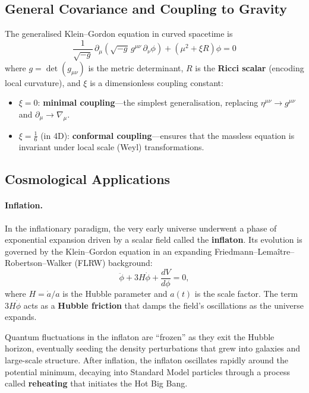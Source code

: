 \documentclass[12pt, a4paper]{article}
\theoremstyle{definition}
\begin{document}
\subsection{General Covariance and Coupling to Gravity}

The generalised Klein--Gordon equation in curved spacetime is
\begin{equation}\label{eq:KG-curved}
    \boxed{\;
    \frac{1}{\sqrt{-g}}\,\partial_{\mu}\!\left(
      \sqrt{-g}\,g^{\mu\nu}\,\partial_{\nu}\phi
    \right)
    + \left(\mu^{2} + \xi R\right)\phi = 0
    \;}
\end{equation}
where $g = \det(g_{\mu\nu})$ is the metric determinant, $R$ is the
\textbf{Ricci scalar} (encoding local curvature), and $\xi$ is a
dimensionless coupling constant:
\begin{itemize}
    \item $\xi = 0$: \textbf{minimal coupling}---the simplest
          generalisation, replacing $\eta^{\mu\nu}\to g^{\mu\nu}$ and
          $\partial_{\mu}\to\nabla_{\mu}$.
    \item $\xi = \tfrac{1}{6}$ (in 4D): \textbf{conformal coupling}---ensures
          that the massless equation is invariant under local scale
          (Weyl) transformations.
\end{itemize}

\subsection{Cosmological Applications}

\paragraph{Inflation.}
In the inflationary paradigm, the very early universe underwent a phase of
exponential expansion driven by a scalar field called the \textbf{inflaton}.
Its evolution is governed by the Klein--Gordon equation in an expanding
Friedmann--Lema\^{i}tre--Robertson--Walker (FLRW) background:
\begin{equation}\label{eq:KG-FLRW}
    \ddot{\phi} + 3H\dot{\phi} + \frac{dV}{d\phi} = 0,
\end{equation}
where $H = \dot{a}/a$ is the Hubble parameter and $a(t)$ is the scale factor.
The term $3H\dot\phi$ acts as a \textbf{Hubble friction} that damps the
field's oscillations as the universe expands.

Quantum fluctuations in the inflaton are ``frozen'' as they exit the Hubble
horizon, eventually seeding the density perturbations that grew into galaxies
and large-scale structure.  After inflation, the inflaton oscillates rapidly
around the potential minimum, decaying into Standard Model particles through a
process called \textbf{reheating} that initiates the Hot Big Bang.
\end{document}
